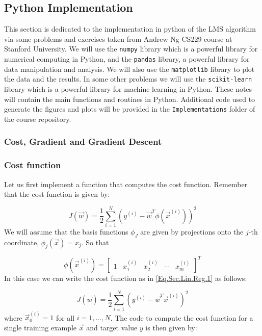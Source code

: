 \subsection{Python Implementation}

This section is dedicated to the implementation in python of the LMS algorithm via some problems and exercises taken from Andrew Ng  \textsc{CS229} course at Stanford University. We will use the \texttt{numpy} library which is a powerful library for numerical computing in Python, and the \texttt{pandas} library, a powerful library for data manipulation and analysis. We will also use the \texttt{matplotlib} library to plot the data and the results. In some other problems we will use the \texttt{scikit-learn} library which is a powerful library for machine learning in Python. These notes will contain the main functions and routines in Python. Additional code used to generate the figures and plots will be provided in the \faFolderOpen \texttt{Implementations} folder of the course repository. 

\subsubsection{Cost, Gradient and Gradient Descent}

\subsubsection*{Cost function}
Let us first implement a function that computes the cost function. Remember that the cost function is given by:	

\begin{equation}\label{Eq.Sec.Lin.Reg.7}
	J(\vec{w}) = \frac{1}{2}\sum_{i=1}^{N} (y^{(i)} - \vec{w}^T\phi(\vec{x}^{(i)}) )^2
\end{equation}	
We will assume that the basis functions $\phi_J$ are given by projections onto the $j$-th coordinate, \ie $\phi_j(\vec{x}) = x_j$. So that 

\[ \phi(\vec{x}^{(i)}) = \begin{bmatrix}
    1 & x_1^{(i)} & x_2^{(i)} & \cdots & x_m^{(i)}
\end{bmatrix}^{T} \]
In this case we can write the cost function as in \cref{Eq.Sec.Lin.Reg.1} as follows:

\begin{equation}\label{Eq.Sec.Lin.Reg.8}
	J(\vec{w}) = \frac{1}{2}\sum_{i=1}^{N} (y^{(i)} - \vec{w}^T \vec{x}^{(i)})^2
\end{equation}
where $\vec{x}_0^{(i)}=1$ for all $i=1,...,N$. The code to compute the cost function for a single training example $\vec{x}$ and target value $y$ is then given by: 

